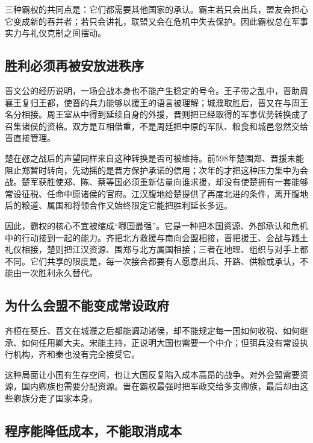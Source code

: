 三种霸权的共同点是：它们都需要其他国家的承认。霸主若只会出兵，盟友会担心它变成新的吞并者；若只会讲礼，联盟又会在危机中失去保护。因此霸权总在军事实力与礼仪克制之间摆动。

\subsection{胜利必须再被安放进秩序}

晋文公的经历说明，一场会战本身也不能产生稳定的号令。王子带之乱中，晋助周襄王复归王都，使晋的兵力能够以援王的语言被理解；城濮取胜后，晋又在与周王名分相接。周王室从中得到延续自身的外援，晋则把已经取得的军事优势转换成了召集诸侯的资格。双方是互相借重，不是周廷把中原的军队、粮食和城邑忽然交给晋直接管理。

楚在邲之战后的声望同样来自这种转换是否可被维持。前598年楚围郑、晋援未能阻止郑暂时转向，先动摇的是晋方保护承诺的信用；次年的才把这种压力集中为会战。楚军获胜使郑、陈、蔡等国必须重新估量向谁求援，却没有使楚拥有一套能够常设征税、任命中原诸侯的官府。江汉腹地给楚提供了再度北进的条件，离开腹地后的粮道、属国和将领合作又始终限定它能把胜利延长多远。

因此，霸权的核心不宜被缩成“哪国最强”。它是一种把本国资源、外部承认和危机中的行动接到一起的能力。齐把北方救援与南向会盟相接，晋把援王、会战与践土礼仪相接，楚则把江汉资源、围郑与北方属国相接；三者在地理、组织与对手上都不同。它们共享的限度是，每一次接合都要有人愿意出兵、开路、供粮或承认，不能由一次胜利永久替代。

\subsection{为什么会盟不能变成常设政府}

齐桓在葵丘、晋文在城濮之后都能调动诸侯，却不能规定每一国如何收税、如何继承、如何任用卿大夫。宋能主持，正说明大国也需要一个中介；但弭兵没有常设执行机构，齐和秦也没有完全接受它。

这种局面让小国有生存空间，也让大国反复陷入成本高昂的战争。对外会盟需要资源，国内卿族也需要分配资源。晋在霸权最强时把军政交给多支卿族，最后却由这些卿族分走了国家本身。

\subsection{程序能降低成本，不能取消成本}

